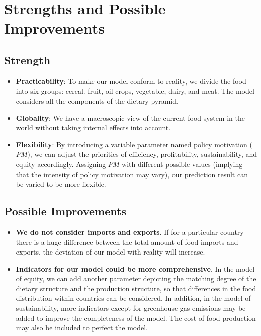 \documentclass[12pt]{article}
\begin{document}
\section{Strengths and Possible Improvements}
\subsection{Strength}

\begin{itemize}
    \item \textbf{Practicability}: To make our model conform to reality, we divide the food into six groups: cereal. fruit, oil crops, vegetable, dairy, and meat. The model considers all the components of the dietary pyramid.
    \item \textbf{Globality}: We have a macroscopic view of the current food system in the world without taking internal effects into account.
    \item \textbf{Flexibility}: By introducing a variable parameter named policy motivation ($PM$), we can adjust the priorities of efficiency, profitability, sustainability, and equity accordingly. Assigning $PM$ with different possible values (implying that the intensity of policy motivation may vary), our prediction result can be varied to be more flexible.
\end{itemize}

\subsection{Possible Improvements}

\begin{itemize}
    \item \textbf{We do not consider imports and exports}. If for a particular country there is a huge difference between the total amount of food imports and exports, the deviation of our model with reality will increase. 
    \item \textbf{Indicators for our model could be more comprehensive}. In the model of equity, we can add another parameter depicting the matching degree of the dietary structure and the production structure, so that differences in the food distribution within countries can be considered. In addition, in the model of sustainability, more indicators except for greenhouse gas emissions may be added to improve the completeness of the model. The cost of food production may also be included to perfect the model. 
\end{itemize}
\end{document}
